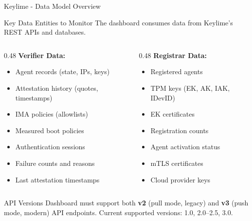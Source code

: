 \begin{frame}{Keylime - Data Model Overview}
  \begin{block}{Key Data Entities to Monitor}
    \scriptsize
    The dashboard consumes data from Keylime's REST APIs and databases.
  \end{block}

  \vspace{0.1cm}

  \scriptsize
  \begin{columns}[T]
    \begin{column}{0.48\textwidth}
      \textbf{Verifier Data:}
      \begin{itemize}
        \item Agent records (state, IPs, keys)
        \item Attestation history (quotes, timestamps)
        \item IMA policies (allowlists)
        \item Measured boot policies
        \item Authentication sessions
        \item Failure counts and reasons
        \item Last attestation timestamps
      \end{itemize}
    \end{column}
    \begin{column}{0.48\textwidth}
      \textbf{Registrar Data:}
      \begin{itemize}
        \item Registered agents
        \item TPM keys (EK, AK, IAK, IDevID)
        \item EK certificates
        \item Registration counts
        \item Agent activation status
        \item mTLS certificates
        \item Cloud provider keys
      \end{itemize}
    \end{column}
  \end{columns}

  \vspace{0.3cm}

  \begin{alertblock}{API Versions}
    \scriptsize
    Dashboard must support both \textbf{v2} (pull mode, legacy) and \textbf{v3} (push mode, modern) API endpoints.
    Current supported versions: 1.0, 2.0--2.5, 3.0.
  \end{alertblock}
\end{frame}
